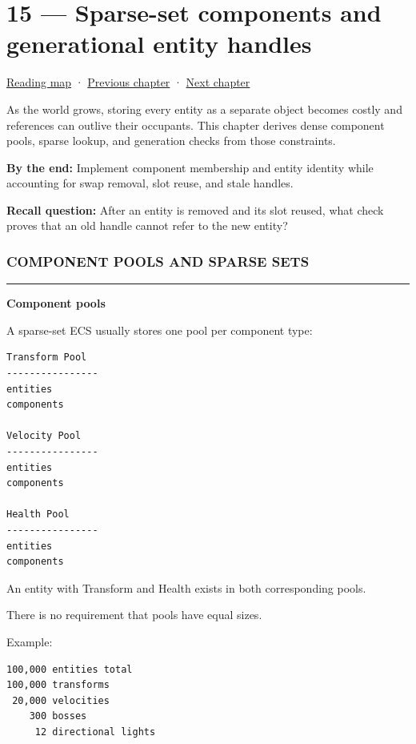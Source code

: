 \hypertarget{05-engine-i-ch015}{}
\section{15 --- Sparse-set components and generational entity handles}\label{sparse-set-components-and-generational-entity-handles}

\href{Chapter\%20Edition/03\%20-\%20Game\%20Engine/00\%20-\%20Reading\%20Map}{Reading map} · \hyperref[05-engine-i-ch014]{Previous chapter} · \hyperref[05-engine-i-ch016]{Next chapter}

As the world grows, storing every entity as a separate object becomes costly and references can outlive their occupants. This chapter derives dense component pools, sparse lookup, and generation checks from those constraints.

\textbf{By the end:} Implement component membership and entity identity while accounting for swap removal, slot reuse, and stale handles.

\textbf{Recall question:} After an entity is removed and its slot reused, what check proves that an old handle cannot refer to the new entity?

\subsubsection{COMPONENT POOLS AND SPARSE SETS}\label{component-pools-and-sparse-sets}

\begin{center}\rule{0.5\linewidth}{0.5pt}\end{center}

\textbf{Component pools}

A sparse-set ECS usually stores one pool per component type:

\begin{verbatim}
Transform Pool
----------------
entities
components

Velocity Pool
----------------
entities
components

Health Pool
----------------
entities
components
\end{verbatim}

An entity with Transform and Health exists in both corresponding pools.

There is no requirement that pools have equal sizes.

Example:

\begin{verbatim}
100,000 entities total
100,000 transforms
 20,000 velocities
    300 bosses
     12 directional lights
\end{verbatim}

